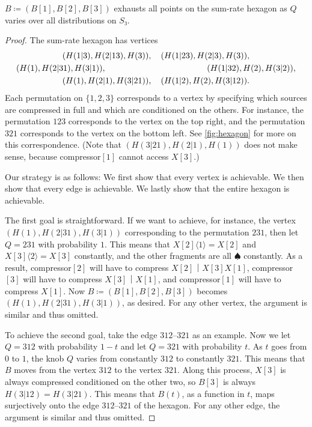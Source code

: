 \documentclass[openany]{amsbook}
\numberwithin{equation}{chapter}
\numberwithin{figure}{chapter}
\numberwithin{table}{chapter}
\theoremstyle{definition}	理dfn:Definition~?s			理exa:Example~?s
\theoremstyle{remark}		理cla:Claim~?s				理rem:Remark~?s
\begin{document}
	\begin{thm}
		$B≔(B[1],B[2],B[3])$ exhausts all points on the sum-rate hexagon
		as $Q$ varies over all distributions on $S₃$.
	\end{thm}
	
	\begin{proof}
		The sum-rate hexagon has vertices
		\begin{gather*}
					(H(1|3),H(2|13),H(3)),\quad(H(1|23),H(2|3),H(3)),			\\
			(H(1),H(2|31),H(3|1)),		\kern12em		(H(1|32),H(2),H(3|2)),	\\
					(H(1),H(2|1),H(3|21)),\quad(H(1|2),H(2),H(3|12)).			
		\end{gather*}
		Each permutation on $\{1,2,3\}$ corresponds to a vertex by specifying
		which sources are compressed in full and which are conditioned on the others.
		For instance, the permutation $123$ corresponds to the vertex on the top right,
		and the permutation $321$ corresponds to the vertex on the bottom left.
		See \cref{fig:hexagon} for more on this correspondence.
		(Note that $(H(3|21),H(2|1),H(1))$ does not make sense,
		because compressor$[1]$ cannot access $X[3]$.)
		
		Our strategy is as follows:
		We first show that every vertex is achievable.
		We then show that every edge is achievable.
		We lastly show that the entire hexagon is achievable.
		
		The first goal is straightforward.
		If we want to achieve, for instance, the vertex $(H(1),H(2|31),H(3|1))$
		corresponding to the permutation $231$, then let $Q=231$ with probability $1$.
		This means that $X[2]⟨1⟩=X[2]$ and $X[3]⟨2⟩=X[3]$ constantly,
		and the other fragments are all $♠$ constantly.
		As a result, compressor$[2]$ will have to compress $X[2]｜X[3]X[1]$,
		compressor$[3]$ will have to compress $X[3]｜X[1]$,
		and compressor$[1]$ will have to compress $X[1]$.
		Now $B≔(B[1],B[2],B[3])$ becomes $(H(1),H(2|31),H(3|1))$, as desired.
		For any other vertex, the argument is similar and thus omitted.
		
		To achieve the second goal, take the edge $312$--$321$ as an example.
		Now we let $Q=312$ with probability $1-t$ and let $Q=321$ with probability $t$.
		As $t$ goes from $0$ to $1$, the knob $Q$ varies from
		constantly $312$ to constantly $321$.
		This means that $B$ moves from the vertex $312$ to the vertex $321$.
		Along this process, $X[3]$ is always compressed conditioned on the other two,
		so $B[3]$ is always $H(3|12)=H(3|21)$.
		This means that $B(t)$, as a function in $t$,
		maps surjectively onto the edge $312$--$321$ of the hexagon.
		For any other edge, the argument is similar and thus omitted.
		

\end{proof}
\end{document}
